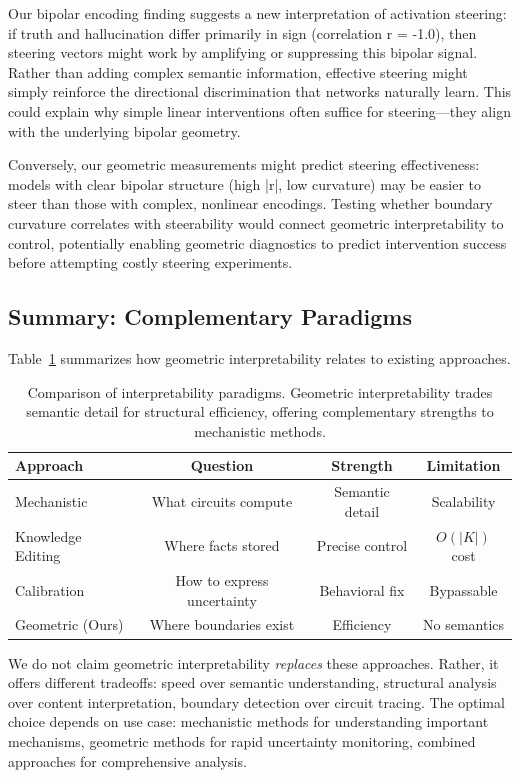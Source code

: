 \documentclass[11pt]{article}
\begin{document}
Our bipolar encoding finding suggests a new interpretation of activation steering: if truth and hallucination differ primarily in sign (correlation r = -1.0), then steering vectors might work by amplifying or suppressing this bipolar signal. Rather than adding complex semantic information, effective steering might simply reinforce the directional discrimination that networks naturally learn. This could explain why simple linear interventions often suffice for steering---they align with the underlying bipolar geometry.

Conversely, our geometric measurements might predict steering effectiveness: models with clear bipolar structure (high |r|, low curvature) may be easier to steer than those with complex, nonlinear encodings. Testing whether boundary curvature correlates with steerability would connect geometric interpretability to control, potentially enabling geometric diagnostics to predict intervention success before attempting costly steering experiments.

\subsection{Summary: Complementary Paradigms}

Table~\ref{tab:paradigm-comparison} summarizes how geometric interpretability relates to existing approaches.

\begin{table}[h]
\centering
\caption{Comparison of interpretability paradigms. Geometric interpretability trades semantic detail for structural efficiency, offering complementary strengths to mechanistic methods.}
\label{tab:paradigm-comparison}
\begin{tabular}{lccc}
\toprule
Approach & Question & Strength & Limitation \\
\midrule
Mechanistic & What circuits compute & Semantic detail & Scalability \\
Knowledge Editing & Where facts stored & Precise control & $O(|K|)$ cost \\
Calibration & How to express uncertainty & Behavioral fix & Bypassable \\
Geometric (Ours) & Where boundaries exist & Efficiency & No semantics \\
\bottomrule
\end{tabular}
\end{table}

We do not claim geometric interpretability \textit{replaces} these approaches. Rather, it offers different tradeoffs: speed over semantic understanding, structural analysis over content interpretation, boundary detection over circuit tracing. The optimal choice depends on use case: mechanistic methods for understanding important mechanisms, geometric methods for rapid uncertainty monitoring, combined approaches for comprehensive analysis.
\end{document}
